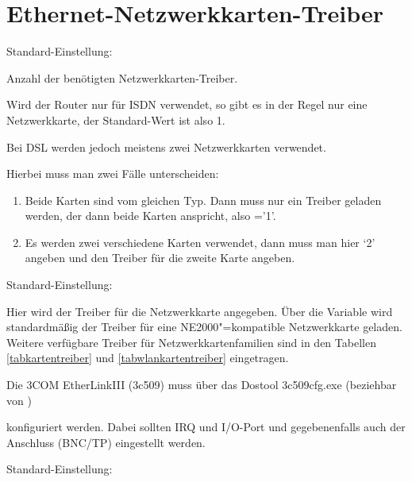 \section{Ethernet-Netzwerkkarten-Treiber}

\begin{description}

    Standard-Einstellung: 

    {Anzahl der benötigten Netzwerkkarten-Treiber.

    Wird der Router nur für ISDN verwendet, so gibt es in der Regel
    nur eine Netzwerkkarte, der Standard-Wert ist also 1.

    Bei DSL werden jedoch meistens zwei Netzwerkkarten verwendet.

    Hierbei muss man zwei Fälle unterscheiden:
    \begin{enumerate}
      \item Beide Karten sind vom gleichen Typ. Dann muss nur ein
        Treiber geladen werden, der dann beide Karten anspricht, also
        ='1'.
      \item Es werden zwei verschiedene Karten verwendet, dann muss man
        hier `2' angeben und den Treiber für die zweite Karte angeben.
    \end{enumerate}
    }



    Standard-Einstellung: 

    {Hier wird der Treiber für die Netzwerkkarte angegeben.
    Über die Variable  wird standardmäßig der
    Treiber für eine NE2000"=kompatible Netzwerkkarte geladen. Weitere
    verfügbare Treiber für
    Netzwerkkartenfamilien sind in den Tabellen \ref{tabkartentreiber} und
    \ref{tabwlankartentreiber} eingetragen.

    Die 3COM EtherLinkIII (3c509) muss über das Dostool 3c509cfg.exe
    (beziehbar von
    )

    konfiguriert werden. Dabei sollten IRQ und I/O-Port und
    gegebenenfalls auch der Anschluss (BNC/TP) eingestellt werden.}


    Standard-Einstellung: 


\end{description}

